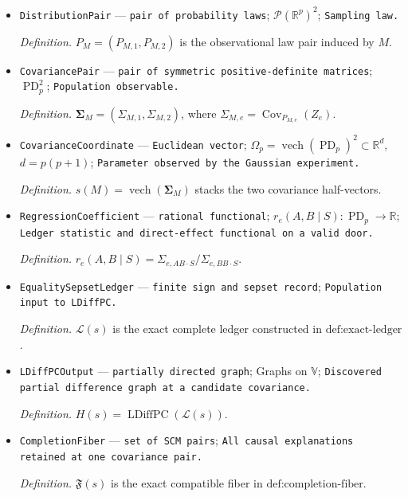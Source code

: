 \documentclass{article}
\begin{document}
\begin{itemize}
  \par\smallskip\noindent\emph{Definition.} \(\mathcal M_p^{\mathrm{df}}\) is the class in \(\text{def:boundary-model-class}\).
  \item \texttt{DistributionPair} --- \texttt{pair of probability laws}; \(\mathcal P(\mathbb R^p)^2\); \texttt{Sampling law.}
  \par\smallskip\noindent\emph{Definition.} \(P_M=(P_{M,1},P_{M,2})\) is the observational law pair induced by \(M\).
  \item \texttt{CovariancePair} --- \texttt{pair of symmetric positive-\allowbreak{}definite matrices}; \(\operatorname{PD}_p^2\); \texttt{Population observable.}
  \par\smallskip\noindent\emph{Definition.} \(\boldsymbol\Sigma_M=(\Sigma_{M,1},\Sigma_{M,2})\), where \(\Sigma_{M,e}=\operatorname{Cov}_{P_{M,e}}(Z_e)\).
  \item \texttt{CovarianceCoordinate} --- \texttt{Euclidean vector}; \(\Omega_p=\operatorname{vech}(\operatorname{PD}_p)^2\subset\mathbb R^d\), \(d=p(p+1)\); \texttt{Parameter observed by the Gaussian experiment.}
  \par\smallskip\noindent\emph{Definition.} \(s(M)=\operatorname{vech}(\boldsymbol\Sigma_M)\) stacks the two covariance half-vectors.
  \item \texttt{RegressionCoefficient} --- \texttt{rational functional}; \(r_e(A,B\mid S):\operatorname{PD}_p\to\mathbb R\); \texttt{Ledger statistic and direct-\allowbreak{}effect functional on a valid door.}
  \par\smallskip\noindent\emph{Definition.} \(r_e(A,B\mid S)=\Sigma_{e,AB\cdot S}/\Sigma_{e,BB\cdot S}\).
  \item \texttt{EqualitySepsetLedger} --- \texttt{finite sign and sepset record}; \texttt{Population input to LDiffPC.}
  \par\smallskip\noindent\emph{Definition.} \(\mathcal L(s)\) is the exact complete ledger constructed in \(\text{def:exact-ledger}\).
  \item \texttt{LDiffPCOutput} --- \texttt{partially directed graph}; Graphs on \(\mathbb V\); \texttt{Discovered partial difference graph at a candidate covariance.}
  \par\smallskip\noindent\emph{Definition.} \(H(s)=\operatorname{LDiffPC}(\mathcal L(s))\).
  \item \texttt{CompletionFiber} --- \texttt{set of SCM pairs}; \texttt{All causal explanations retained at one covariance pair.}
  \par\smallskip\noindent\emph{Definition.} \(\mathfrak F(s)\) is the exact compatible fiber in \(\text{def:completion-fiber}\).

\end{itemize}
\end{document}
